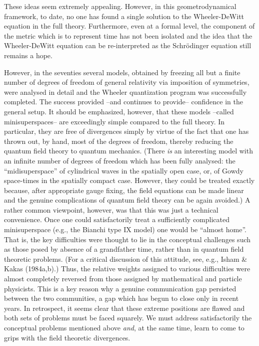 These ideas seem extremely appealing. However, in this geometrodynamical
framework, to date, no one has found a single solution to the Wheeler-DeWitt
equation in the full theory. Furthermore, even at a formal level, the
component of the metric which is to represent time has not been isolated and
the idea that the Wheeler-DeWitt equation can be re-interpreted as the
Schr\"odinger equation still remains a hope.

However, in the seventies several models, obtained by freezing all but a
finite number of degrees of freedom of general relativity via imposition of
symmetries, were analysed in detail and the Wheeler quantization program
was successfully completed. The success provided --and continues to provide--
confidence in the general setup. It should be emphasized, however, that these
models --called minisuperspaces-- are exceedingly simple compared to the full
theory. In particular, they are free of divergences simply by virtue of the
fact that one has thrown out, by hand, most of the degrees of freedom,
thereby reducing the quantum field theory to quantum mechanics. (There {\it is}
an interesting model with an infinite number of degrees of freedom which has
been fully analysed: the ``midisuperspace'' of cylindrical waves in the
spatially open case, or, of Gowdy space-times in the spatially compact case.
However, they could be treated exactly because, after appropriate gauge
fixing, the field equations can be made linear and the genuine complications
of quantum field theory can be again avoided.) A rather common viewpoint,
however,
was that this was just a technical convenience. Once one could satisfactorily
treat a sufficiently complicated minisuperspace (e.g., the Bianchi type IX
model) one would be ``almost home''. That is, the key difficulties were
thought to lie in the conceptual challenges such as those posed by absence of
a grandfather time, rather than in quantum field theoretic problems. (For a
critical discussion of this attitude, see, e.g., Isham \& Kakas (1984a,b).)
Thus, the relative weights assigned to various difficulties were almost
completely reversed from those assigned by mathematical and particle
physicists. This is a key reason why
a genuine communication gap persisted between the two communities, a gap which
has begun to close only in recent years. In retrospect, it seems clear that
these extreme positions are flawed and both sets of problems must be faced
squarely. We must address satisfactorily the conceptual problems mentioned
above {\it and}, at the same time, learn to come to grips with the field
theoretic divergences.


